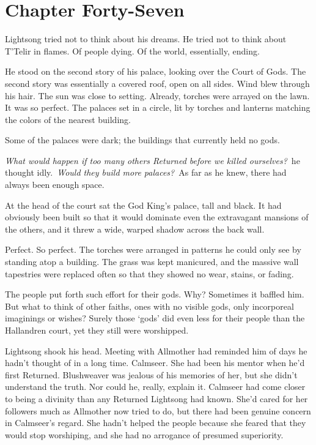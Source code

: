 \section{Chapter Forty-Seven}

Lightsong tried not to think about his dreams. He tried not to think about T’Telir in flames. Of people dying. Of the world, essentially, ending.

He stood on the second story of his palace, looking over the Court of Gods. The second story was essentially a covered roof, open on all sides. Wind blew through his hair. The sun was close to setting. Already, torches were arrayed on the lawn. It was so perfect. The palaces set in a circle, lit by torches and lanterns matching the colors of the nearest building.

Some of the palaces were dark; the buildings that currently held no gods.

\textit{What would happen if too many others Returned before we killed ourselves?}~he thought idly.~\textit{Would they build more palaces?}~As far as he knew, there had always been enough space.

At the head of the court sat the God King’s palace, tall and black. It had obviously been built so that it would dominate even the extravagant mansions of the others, and it threw a wide, warped shadow across the back wall.

Perfect. So perfect. The torches were arranged in patterns he could only see by standing atop a building. The grass was kept manicured, and the massive wall tapestries were replaced often so that they showed no wear, stains, or fading.

The people put forth such effort for their gods. Why? Sometimes it baffled him. But what to think of other faiths, ones with no visible gods, only incorporeal imaginings or wishes? Surely those ‘gods’ did even less for their people than the Hallandren court, yet they still were worshipped.

Lightsong shook his head. Meeting with Allmother had reminded him of days he hadn’t thought of in a long time. Calmseer. She had been his mentor when he’d first Returned. Blushweaver was jealous of his memories of her, but she didn’t understand the truth. Nor could he, really, explain it. Calmseer had come closer to being a divinity than any Returned Lightsong had known. She’d cared for her followers much as Allmother now tried to do, but there had been genuine concern in Calmseer’s regard. She hadn’t helped the people because she feared that they would stop worshiping, and she had no arrogance of presumed superiority.

